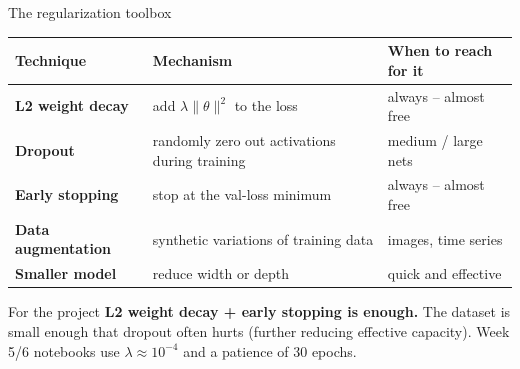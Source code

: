 \documentclass[aspectratio=169,10pt]{beamer}
\begin{document}
\begin{frame}{The regularization toolbox}
\centering
\small
\begin{tabular}{lll}
\toprule
Technique & Mechanism & When to reach for it \\
\midrule
\textbf{L2 weight decay} & add $\lambda \|\theta\|^2$ to the loss & always -- almost free \\
\textbf{Dropout} & randomly zero out activations during training & medium / large nets \\
\textbf{Early stopping} & stop at the val-loss minimum & always -- almost free \\
\textbf{Data augmentation} & synthetic variations of training data & images, time series \\
\textbf{Smaller model} & reduce width or depth & quick and effective \\
\bottomrule
\end{tabular}
\vspace{0.5em}
\begin{block}{For the project}
\textbf{L2 weight decay + early stopping is enough.} The dataset is small enough that dropout often hurts (further reducing effective capacity). Week 5/6 notebooks use $\lambda \approx 10^{-4}$ and a patience of 30 epochs.
\end{block}
\end{frame}
\end{document}
